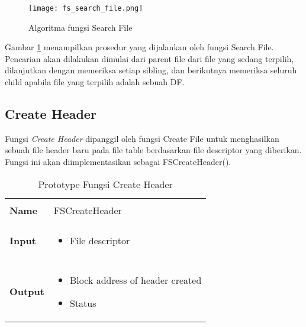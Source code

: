 \documentclass[a4paper, 12pt]{report}
\begin{document}


\begin{figure}
\centering
\texttt{[image: fs\_search\_file.png]}
\caption{Algoritma fungsi Search File}
\label{fig-search-file}
\end{figure}

Gambar \ref{fig-search-file} menampilkan prosedur yang dijalankan oleh fungsi Search File. Pencarian akan dilakukan dimulai dari parent file dari file yang sedang terpilih, dilanjutkan dengan memeriksa setiap sibling, dan berikutnya memeriksa seluruh child apabila file yang terpilih adalah sebuah DF. 

\subsection{Create Header}

Fungsi {\em Create Header} dipanggil oleh fungsi Create File untuk menghasilkan sebuah file header baru pada file table berdasarkan file descriptor yang diberikan. Fungsi ini akan diimplementasikan sebagai FSCreateHeader().

\begin{table}[hp]
  \centering
  \begin{tabular}{p{2cm} p{8cm}}
    \hline\\
    {\bf Name} & FSCreateHeader\\
    \hline\\
    {\bf Input} & 
    \begin{itemize}[noitemsep,topsep=0pt,parsep=0pt,partopsep=0pt]
    \item File descriptor
    \end{itemize}
    \\
    \hline\\
    {\bf Output} & 
    \begin{itemize}[noitemsep,topsep=0pt,parsep=0pt,partopsep=0pt]
    \item Block address of header created
    \item Status
    \end{itemize}
    \\
    \hline
  \end{tabular}
  \caption{Prototype Fungsi Create Header}
  \label{tbl-create-header}
\end{table}
\end{document}
